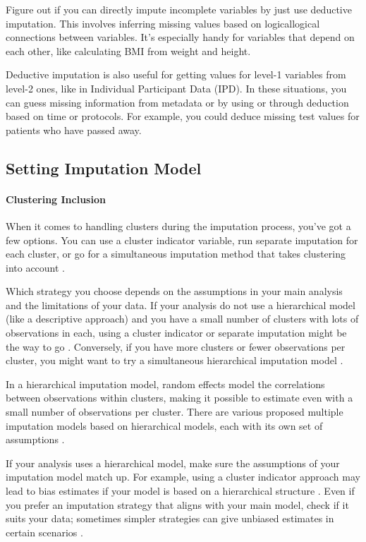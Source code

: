 \documentclass[
  article]{jss}
\let\oldparagraph\paragraph
\renewcommand{\paragraph}[1]{\oldparagraph{#1}\mbox{}}
\begin{document}
Figure out if you can directly impute incomplete variables by just use
deductive imputation. This involves inferring missing values based on
logicallogical connections between variables. It's especially handy for
variables that depend on each other, like calculating BMI from weight
and height.

Deductive imputation is also useful for getting values for level-1
variables from level-2 ones, like in Individual Participant Data (IPD).
In these situations, you can guess missing information from metadata or
by using or through deduction based on time or protocols. For example,
you could deduce missing test values for patients who have passed away.

\hypertarget{setting-imputation-model}{%
\subsection{Setting Imputation Model}\label{setting-imputation-model}}

\hypertarget{clustering-inclusion}{%
\paragraph{Clustering Inclusion}\label{clustering-inclusion}}

When it comes to handling clusters during the imputation process, you've
got a few options. You can use a cluster indicator variable, run
separate imputation for each cluster, or go for a simultaneous
imputation method that takes clustering into account \cite{eddings}.

Which strategy you choose depends on the assumptions in your main
analysis and the limitations of your data. If your analysis do not use a
hierarchical model (like a descriptive approach) and you have a small
number of clusters with lots of observations in each, using a cluster
indicator or separate imputation might be the way to go
\cite{graham2009}. Conversely, if you have more clusters or fewer
observations per cluster, you might want to try a simultaneous
hierarchical imputation model \cite{Allison_2002}.

In a hierarchical imputation model, random effects model the
correlations between observations within clusters, making it possible to
estimate even with a small number of observations per cluster. There are
various proposed multiple imputation models based on hierarchical
models, each with its own set of assumptions \cite{audigier}.

If your analysis uses a hierarchical model, make sure the assumptions of
your imputation model match up. For example, using a cluster indicator
approach may lead to bias estimates if your model is based on a
hierarchical structure \cite{taljaard2008,speidel2018}. Even if you
prefer an imputation strategy that aligns with your main model, check if
it suits your data; sometimes simpler strategies can give unbiased
estimates in certain scenarios \cite{bailey2020}.
\end{document}
